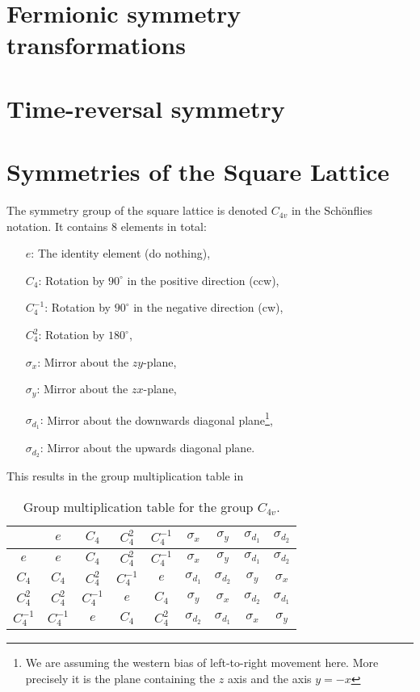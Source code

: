 \section{Fermionic symmetry transformations}

\section{Time-reversal symmetry}

\section{Symmetries of the Square Lattice}

The symmetry group of the square lattice is denoted $C_{4v}$ in the Sch\"onflies notation. It contains $8$ elements in total:
\begin{itemize}
    \item[$e$:] The identity element (do nothing),
    \item[$C_4$:] Rotation by $90^\circ$ in the positive direction (ccw),
    \item[$C_4^{-1}$:] Rotation by $90^\circ$ in the negative direction (cw),
    \item[$C_4^2$:] Rotation by $180^\circ$,
    \item[$\sigma_x$:] Mirror about the $zy$-plane,
    \item[$\sigma_y$:] Mirror about the $zx$-plane,
    \item[$\sigma_{d_1}$:] Mirror about the downwards diagonal plane\footnote{We are assuming the western bias of left-to-right movement
        here. More precisely it is the plane containing the $z$ axis and the axis $y=-x$},
    \item[$\sigma_{d_2}$:] Mirror about the upwards diagonal plane.
\end{itemize}
This results in the group multiplication table in 
\begin{table}
    \centering
    \begin{tabular}{c|cccccccc}
        & $e$ & $C_4$ &$C_4^2$ & $C_4^{-1}$ & $\sigma_x$ & $\sigma_y$ & $\sigma_{d_1}$ & $\sigma_{d_2}$\\ \hline
        $e$ & $e$ & $C_4$ & $C_4^2$ & $C_4^{-1}$ & $\sigma_x$ & $\sigma_y$ & $\sigma_{d_1}$ & $\sigma_{d_2}$\\
        $C_4$ & $C_4$ & $C_4^2$ & $C_4^{-1}$ & $e$ & $\sigma_{d_1}$ & $\sigma_{d_2}$ & $\sigma_y$ & $\sigma_x$\\
        $C_4^2$ & $C_4^2$ & $C_4^{-1}$ & $e$ & $C_4$ & $\sigma_y$ & $\sigma_x$ & $\sigma_{d_2}$ & $\sigma_{d_1}$\\
        $C_4^{-1}$ & $C_4^{-1}$ & $e$ & $C_4$ & $C_4^2$ & $\sigma_{d_2}$ & $\sigma_{d_1}$ & $\sigma_x$ & $\sigma_y$
    \end{tabular}
    \caption{Group multiplication table for the group $C_{4v}$.}
    \label{tab:Group:Symm:multTab}
\end{table}

